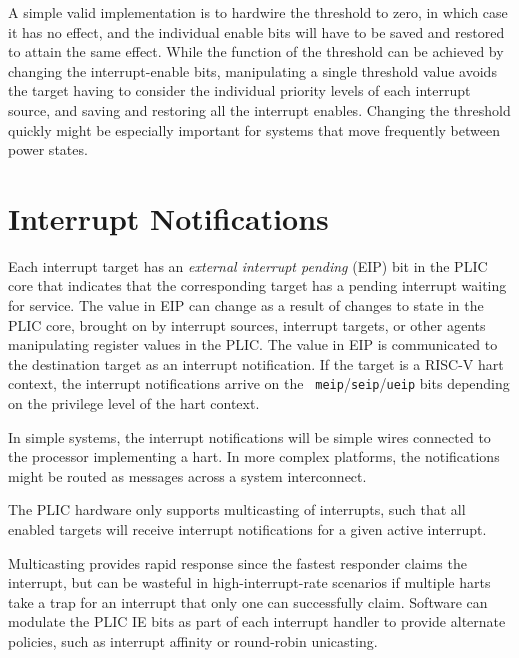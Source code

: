 \begin{commentary}
A simple valid implementation is to hardwire the threshold to zero, in
which case it has no effect, and the individual enable bits will have
to be saved and restored to attain the same effect.  While the
function of the threshold can be achieved by changing the
interrupt-enable bits, manipulating a single threshold value avoids
the target having to consider the individual priority levels of each
interrupt source, and saving and restoring all the interrupt enables.
Changing the threshold quickly might be especially important for
systems that move frequently between power states.
\end{commentary}

\section{Interrupt Notifications}

Each interrupt target has an {\em external interrupt pending} (EIP)
bit in the PLIC core that indicates that the corresponding target has
a pending interrupt waiting for service.  The value in EIP can change
as a result of changes to state in the PLIC core, brought on by
interrupt sources, interrupt targets, or other agents manipulating
register values in the PLIC.  The value in EIP is communicated to the
destination target as an interrupt notification.  If the target is a
RISC-V hart context, the interrupt notifications arrive on the {\tt
  meip}/{\tt seip}/{\tt ueip} bits depending on the
privilege level of the hart context.

\begin{commentary}
In simple systems, the interrupt notifications will be simple wires
connected to the processor implementing a hart.  In more complex
platforms, the notifications might be routed as messages across a
system interconnect.
\end{commentary}

The PLIC hardware only supports multicasting of interrupts, such that
all enabled targets will receive interrupt notifications for a given
active interrupt.

\begin{commentary}
Multicasting provides rapid response since the fastest responder
claims the interrupt, but can be wasteful in high-interrupt-rate
scenarios if multiple harts take a trap for an interrupt that only one
can successfully claim.  Software can modulate the PLIC IE bits as
part of each interrupt handler to provide alternate policies, such as
interrupt affinity or round-robin unicasting.
\end{commentary}

